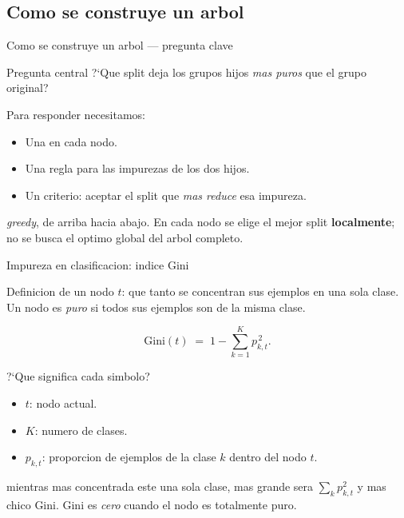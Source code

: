 \subsection{Como se construye un arbol}

\begin{frame}{Como se construye un arbol — pregunta clave}
\begin{block}{Pregunta central}
\small
?`Que split deja los grupos hijos \emph{mas puros} que el grupo original?
\end{block}

\vspace{0.3em}
Para responder necesitamos:
\begin{itemize}\small
  \item Una  en cada nodo.
  \item Una regla para  las impurezas de los dos hijos.
  \item Un criterio: aceptar el split que \emph{mas reduce} esa impureza.
\end{itemize}

\vspace{0.3em}
 \emph{greedy}, de arriba hacia abajo. En cada nodo se elige el mejor split \textbf{localmente}; no se busca el optimo global del arbol completo.
\end{frame}

\begin{frame}{Impureza en clasificacion: indice Gini}
\begin{block}{Definicion}
\small
{} de un nodo $t$: que tanto se concentran sus ejemplos en una sola clase. Un nodo es \emph{puro} si todos sus ejemplos son de la misma clase.
\end{block}

\vspace{0.3em}
\[
\mathrm{Gini}(t) \;=\; 1 - \sum_{k=1}^{K} p_{k,t}^{\,2}.
\]

\vspace{0.2em}
?`Que significa cada simbolo?
\begin{itemize}\small
  \item $t$: nodo actual.
  \item $K$: numero de clases.
  \item $p_{k,t}$: proporcion de ejemplos de la clase $k$ dentro del nodo $t$.
\end{itemize}

\vspace{0.2em}
 mientras mas concentrada este una sola clase, mas grande sera $\sum_k p_{k,t}^2$ y mas chico Gini. Gini es \emph{cero} cuando el nodo es totalmente puro.
\end{frame}

